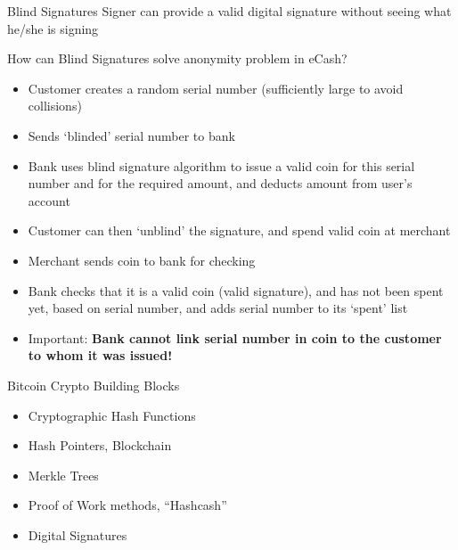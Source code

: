 \begin{note}{Blind Signatures}
	Signer can provide a valid digital signature without seeing what he/she is signing
\end{note}
How can Blind Signatures solve anonymity problem in eCash?
\begin{itemize}
	\item Customer creates a random serial number (sufficiently large to avoid collisions)
	\item Sends `blinded' serial number to bank
	\item Bank uses blind signature algorithm to issue a valid coin for this serial number and for the required amount, and deducts amount from user's account
	\item Customer can then `unblind' the signature, and spend valid coin at merchant
	\item Merchant sends coin to bank for checking
	\item Bank checks that it is a valid coin (valid signature), and has not been spent yet, based on serial number, and adds serial number to its `spent' list
	\item Important: \textbf{Bank cannot link serial number in coin to the customer to whom it was issued!}
\end{itemize}
\begin{note}{Bitcoin Crypto Building Blocks}
	\begin{itemize}
		\item Cryptographic Hash Functions
		\item Hash Pointers, Blockchain
		\item Merkle Trees
		\item Proof of Work methods, ``Hashcash''
		\item Digital Signatures
	\end{itemize}
\end{note}

